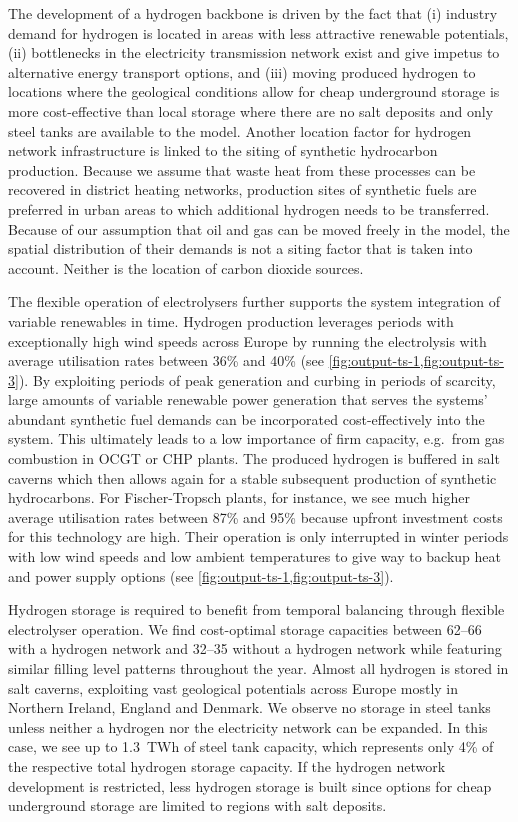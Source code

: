 The development of a hydrogen backbone is driven by the fact that (i) industry
demand for hydrogen is located in areas with less attractive renewable
potentials, (ii) bottlenecks in the electricity transmission network exist and
give impetus to alternative energy transport options, and (iii) moving produced
hydrogen to locations where the geological conditions allow for cheap
underground storage is more cost-effective than local storage where there are no
salt deposits and only steel tanks are available to the model. Another location
factor for hydrogen network infrastructure is linked to the siting of synthetic
hydrocarbon production. Because we assume that waste heat from these processes
can be recovered in district heating networks, production sites of synthetic
fuels are preferred in urban areas to which additional hydrogen needs to be
transferred. Because of our assumption that oil and gas can be moved freely in
the model, the spatial distribution of their demands is not a siting factor that
is taken into account. Neither is the location of carbon dioxide sources.

The flexible operation of electrolysers further supports the system integration
of variable renewables in time. Hydrogen production leverages periods with
exceptionally high wind speeds across Europe by running the electrolysis with
average utilisation rates between 36\% and 40\% (see
\cref{fig:output-ts-1,fig:output-ts-3}). By exploiting periods of peak
generation and curbing in periods of scarcity, large amounts of variable
renewable power generation that serves the systems' abundant synthetic fuel
demands can be incorporated cost-effectively into the system. This ultimately
leads to a low importance of firm capacity, e.g.~from gas combustion in OCGT or
CHP plants. The produced hydrogen is buffered in salt caverns which then allows
again for a stable subsequent production of synthetic hydrocarbons. For
Fischer-Tropsch plants, for instance, we see much higher average utilisation
rates between 87\% and 95\% because upfront investment costs for this technology
are high. Their operation is only interrupted in winter periods with low wind
speeds and low ambient temperatures to give way to backup heat and power supply
options (see \cref{fig:output-ts-1,fig:output-ts-3}).

Hydrogen storage is required to benefit from temporal balancing through flexible
electrolyser operation. We find cost-optimal storage capacities between
\SIrange{62}{66}{\twh} with a hydrogen network and \SIrange{32}{35}{\twh}
without a hydrogen network while featuring similar filling level patterns
throughout the year. Almost all hydrogen is stored in salt caverns, exploiting
vast geological potentials across Europe mostly in Northern Ireland, England and
Denmark. We observe no storage in steel tanks unless neither a hydrogen nor the
electricity network can be expanded. In this case, we see up to 1.3~TWh of steel
tank capacity, which represents only 4\% of the respective total hydrogen
storage capacity. If the hydrogen network development is restricted, less
hydrogen storage is built since options for cheap underground storage are
limited to regions with salt deposits.

